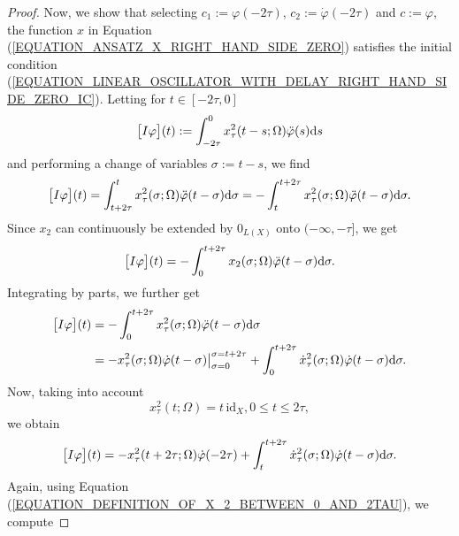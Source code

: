 \documentclass[12pt]{article}
\numberwithin{equation}{section}
\numberwithin{equation}{section}
\begin{document}
\begin{proof}
		Now, we show that selecting $c_{1} := \varphi(-2\tau)$, $c_{2} := \dot{\varphi}(-2\tau)$ and $c := \varphi$,
		the function $x$ in Equation (\ref{EQUATION_ANSATZ_X_RIGHT_HAND_SIDE_ZERO}) satisfies the initial condition (\ref{EQUATION_LINEAR_OSCILLATOR_WITH_DELAY_RIGHT_HAND_SIDE_ZERO_IC}).
		Letting for $t \in [-2\tau, 0]$
		\begin{equation}
			\big[I \varphi\big](t) := \int_{-2\tau}^{0} x^{2}_{\tau}(t - s; \Omega) \ddot{\varphi}(s) \mathrm{d}s \notag
		\end{equation}
		and performing a change of variables $\sigma := t - s$, we find
		\begin{equation}
			\big[I \varphi\big](t) =
			\int_{t + 2\tau}^{t} x^{2}_{\tau}(\sigma; \Omega) \ddot{\varphi}(t - \sigma) \mathrm{d}\sigma
			= -\int_{t}^{t + 2\tau} x^{2}_{\tau}(\sigma; \Omega) \ddot{\varphi}(t - \sigma) \mathrm{d}\sigma. \notag
		\end{equation}
		Since $x_{2}$ can continuously be extended by $0_{L(X)}$ onto $(-\infty, -\tau]$, we get
		\begin{equation}
			\big[I \varphi\big](t) = -\int_{0}^{t + 2\tau} x_{2}(\sigma; \Omega) \ddot{\varphi}(t - \sigma) \mathrm{d}\sigma. \notag
		\end{equation}
		Integrating by parts, we further get
		\begin{equation}
			\begin{split}
				\big[I \varphi\big](t) &=
				-\int_{0}^{t + 2\tau} x^{2}_{\tau}(\sigma; \Omega) \ddot{\varphi}(t - \sigma) \mathrm{d}\sigma \\
				&= -x^{2}_{\tau}(\sigma; \Omega) \dot{\varphi}(t - \sigma)\big|_{\sigma = 0}^{\sigma = t + 2\tau} +
				\int_{0}^{t + 2\tau} \dot{x}^{2}_{\tau}(\sigma; \Omega) \dot{\varphi}(t - \sigma) \mathrm{d}\sigma.
			\end{split}
			\notag
		\end{equation}
		Now, taking into account
		\begin{equation}
			x^{2}_{\tau}(t; \Omega) = t \, \mathrm{id}_{X}, 0 \leq t \leq 2\tau, \label{EQUATION_DEFINITION_OF_X_2_BETWEEN_0_AND_2TAU}
		\end{equation}
		we obtain
		\begin{equation}
			\big[I \varphi\big](t) = -x^{2}_{\tau}(t + 2\tau; \Omega) \dot{\varphi}(-2\tau) + \int_{t}^{t + 2\tau} \dot{x}^{2}_{\tau}(\sigma; \Omega) \dot{\varphi}(t - \sigma) \mathrm{d}\sigma. \notag
		\end{equation}
		Again, using Equation (\ref{EQUATION_DEFINITION_OF_X_2_BETWEEN_0_AND_2TAU}), we compute

\end{proof}
\end{document}
